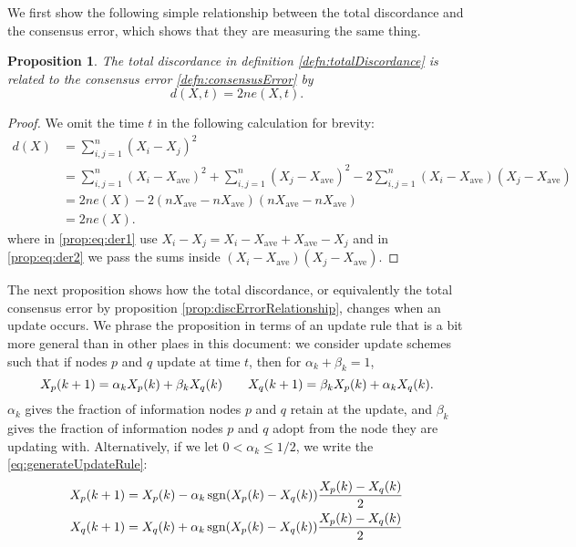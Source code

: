 \documentclass{amsart}
\DeclareMathOperator{\sgn}{sgn}
\newtheorem{proposition}{Proposition}
\theoremstyle{remark}
\begin{document}
We first show the following simple relationship between the total discordance and the consensus error, which shows that they are measuring the same thing.
\begin{proposition}{\label{prop:discErrorRelationship}}
	The total discordance in definition \ref{defn:totalDiscordance} is related to the consensus error \ref{defn:consensusError} by 
\begin{equation*}
d(X,t) = 2ne(X,t).
\end{equation*}
\end{proposition}
\begin{proof}
We omit the time $t$ in the following calculation for brevity:
\begin{align}
d(X) &= \sum_{i,j=1}^n(X_i-X_j)^2 \nonumber\\
&= \sum_{i,j=1}^n(X_i-X_{\text{ave}})^2 + \sum_{i,j=1}^n(X_j-X_{\text{ave}})^2 - 2\sum_{i,j=1}^n(X_i-X_{\text{ave}})(X_j-X_{\text{ave}}) \label{prop:eq:der1}\\
&= 2ne(X) -  2(nX_{\text{ave}}-nX_{\text{ave}})(nX_{\text{ave}}-nX_{\text{ave}})\label{prop:eq:der2}\\
&= 2ne(X).
\end{align}
where in \eqref{prop:eq:der1} use $X_i-X_j = X_i - X_{\text{ave}} + X_{\text{ave}} - X_j$ and in \eqref{prop:eq:der2} we pass the sums inside $(X_i-X_{\text{ave}})(X_j-X_{\text{ave}})$.
\end{proof}

The next proposition shows how the total discordance, or equivalently the total consensus error by proposition \ref{prop:discErrorRelationship}, changes when an update occurs.  We phrase the proposition in terms of an update rule that is a bit more general than in other plaes in this document: we consider update schemes such that if nodes $p$ and $q$ update at time $t$, then for $\alpha_k+\beta_k=1$,
\begin{equation}{\label{eq:generalUpdateRule}}
X_p(k+1) = \alpha_kX_p(k) + \beta_kX_q(k) \qquad X_q(k+1) = \beta_kX_p(k) + \alpha_kX_q(k).
\end{equation}
$\alpha_k$ gives the fraction of information nodes $p$ and $q$ retain at the update, and $\beta_k$ gives the fraction of information nodes $p$ and $q$ adopt from the node they are updating with. Alternatively, if we let $0<\alpha_k\leq1/2$, we write the \eqref{eq:generateUpdateRule}:
\begin{equation}{\label{eq:generalUpdateRule2}}
\begin{aligned}
	X_p(k+1) &= X_p(k) - \alpha_k\sgn(X_p(k)-X_q(k))\frac{X_p(k)-X_q(k)}{2}\\
	X_q(k+1) &= X_q(k) + \alpha_k\sgn(X_p(k)-X_q(k))\frac{X_p(k)-X_q(k)}{2}
\end{aligned}
\end{equation}
\end{document}

